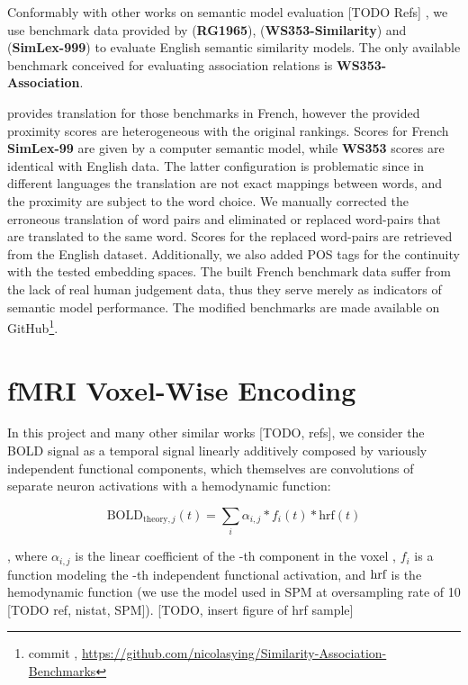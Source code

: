 Conformably with other works on semantic model evaluation [TODO Refs] \parencite{saediWordNetEmbeddings2018}, we use benchmark data provided by \cite{rubensteinContextualCorrelatesSynonymy1965} (\textbf{RG1965}), \cite{agirreStudySimilarityRelatedness2009} (\textbf{WS353-Similarity}) and \cite{hillSimLex999EvaluatingSemantic2015} (\textbf{SimLex-999}) to evaluate English semantic similarity models. The only available benchmark conceived for evaluating association relations is \textbf{WS353-Association}.

\label{subsection:frenchbenchmarkdataconstruction}
\cite{freitasSemanticRelatednessAll2016} provides translation for those benchmarks in French, however the provided proximity scores are heterogeneous with the original rankings. Scores for French \textbf{SimLex-99} are given by a computer semantic model, while \textbf{WS353} scores are identical with English data. The latter configuration is problematic since in different languages the translation are not exact mappings between words, and the proximity are subject to the word choice. We manually corrected the erroneous translation of word pairs and eliminated or replaced word-pairs that are translated to the same word. Scores for the replaced word-pairs are retrieved from the English dataset. Additionally, we also added POS tags for the continuity with the tested embedding spaces. The built French benchmark data suffer from the lack of real human judgement data, thus they serve merely as indicators of semantic model performance. The modified benchmarks are made available on GitHub\footnote{commit , \url{https://github.com/nicolasying/Similarity-Association-Benchmarks}}.

\section{fMRI Voxel-Wise Encoding}

In this project and many other similar works [TODO, refs], we consider the BOLD signal as a temporal signal linearly additively composed by variously independent functional components, which themselves are convolutions of separate neuron activations with a hemodynamic function: 

\begin{equation}
    \text{BOLD}_{\text{theory}, j}(t) = \sum_i {\alpha_{i,j} * f_{i}(t) * \text{hrf}(t)}
\label{eqn:boldlinear}
\end{equation}

, where \(\alpha_{i,j}\) is the linear coefficient of the -th component in the voxel , \(f_{i}\) is a function modeling the -th independent functional activation, and \(\textnormal{hrf}\) is the hemodynamic function (we use the model used in SPM at oversampling rate of 10 [TODO ref, nistat, SPM]). [TODO, insert figure of hrf sample] 

